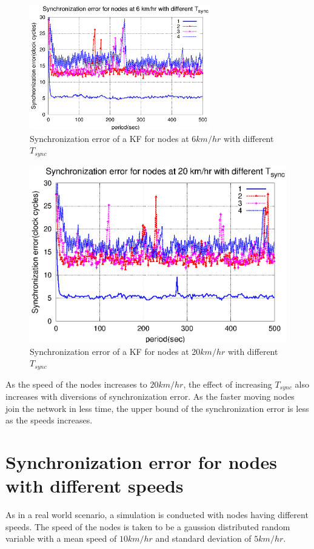 \documentclass[a4paper,10pt]{report}
\begin{document}
\begin{figure}[!h]
\centering
\includegraphics[width= 0.7\textwidth]{tsync6}
\caption{Synchronization error of a KF for nodes at 6$km/hr$ with different $T_{sync}$} \label{tsync6}
\end{figure}
\begin{figure}[!h]
\centering
\includegraphics[width= 0.7 \textwidth]{tsync20}
\caption{Synchronization error of a KF for nodes at 20$km/hr$ with different $T_{sync}$} \label{tsync20}
\end{figure}
As the speed of the nodes increases to $20km/hr$, the effect of increasing $T_{sync}$ also increases with diversions of synchronization error. As the faster moving nodes join the network in less time, the upper bound of the synchronization error is less as the speeds increases.
\section{\textbf{Synchronization error for nodes with different speeds}}
As in a real world scenario, a simulation is conducted with nodes having different speeds. The speed of the nodes is taken to be a gaussion distributed random variable with a mean speed of $10km/hr$ and standard deviation of $5km/hr$.
\end{document}
